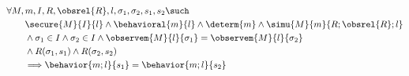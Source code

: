 \begin{thm}
{\small
\begin{align*}
& \forall M, m, I, R, 
\obsrel{R},
l, \sigma_1, \sigma_2, s_1, s_2 \such \\
& \qquad \secure{M}{I}{l} \land \behavioral{m}{l} \land \determ{m} \land
\simu{M}{m}{R;\obsrel{R};l} \\
& \qquad \land \sigma_1 \in I \land \sigma_2 \in I \land
\observem{M}{l}{\sigma_1} = \observem{M}{l}{\sigma_2} \\
& \qquad \land R(\sigma_1,s_1) \land R(\sigma_2,s_2) \\
& \qquad \Longrightarrow
\behavior{m;l}{s_1} = \behavior{m;l}{s_2}
\end{align*}}
\end{thm}

